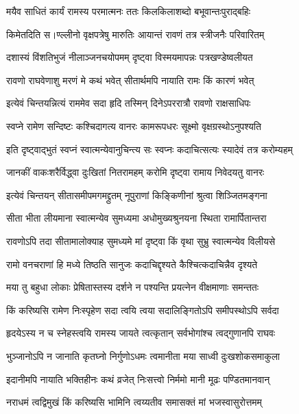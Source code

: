 \twolineshloka
{मयैव साधितं कार्यं रामस्य परमात्मनः}
{ततः किलकिलाशब्दो बभूवान्तःपुराद्बहिः} %

\twolineshloka
{किमेतदिति स।ण्ल्लीनो वृक्षपत्रेषु मारुतिः}
{आयान्तं रावणं तत्र स्त्रीजनैः परिवारितम्} %

\twolineshloka
{दशास्यं विंशतिभुजं नीलाञ्जनचयोपमम्}
{दृष्ट्वा विस्मयमापन्नः पत्रखण्डेष्वलीयत} %

\twolineshloka
{रावणो राघवेणाशु मरणं मे कथं भवेत्}
{सीतार्थमपि नायाति रामः किं कारणं भवेत्} %

\twolineshloka
{इत्येवं चिन्तयन्नित्यं राममेव सदा हृदि}
{तस्मिन् दिनेऽपररात्रौ रावणो राक्षसाधिपः} %

\twolineshloka
{स्वप्ने रामेण सन्दिष्टः कश्चिदागत्य वानरः}
{कामरूपधरः सूक्ष्मो वृक्षग्रस्थोऽनुपश्यति} %

\twolineshloka
{इति दृष्ट्वाद्भुतं स्वप्नं स्वात्मन्येवानुचिन्त्य सः}
{स्वप्नः कदाचित्सत्यः स्यादेवं तत्र करोम्यहम्} %

\twolineshloka
{जानकीं वाकःशरैर्विद्ध्वा दुःखितां नितरामहम्}
{करोमि दृष्ट्वा रामाय निवेदयतु वानरः} %

\twolineshloka
{इत्येवं चिन्तयन् सीतासमीपमगमद्द्रुतम्}
{नूपुराणां किङ्किणीनां श्रुत्वा शिञ्जितमङ्गना} %

\twolineshloka
{सीता भीता लीयमाना स्वात्मन्येव सुमध्यमा}
{अधोमुख्यश्रुनयना स्थिता रामार्पितान्तरा} %

\twolineshloka
{रावणोऽपि तदा सीतामालोक्याह सुमध्यमे}
{मां दृष्ट्वा किं वृथा सुभ्रु स्वात्मन्येव विलीयसे} %

\twolineshloka
{रामो वनचराणां हि मध्ये तिष्ठति सानुजः}
{कदाचिद्दृश्यते कैश्चित्कदाचिन्नैव दृश्यते} %

\twolineshloka
{मया तु बहुधा लोकाः प्रेषितास्तस्य दर्शने}
{न पश्यन्ति प्रयत्नेन वीक्षमाणाः समन्ततः} %

\twolineshloka
{किं करिष्यसि रामेण निःस्पृहेण सदा त्वयि}
{त्वया सदालिङ्गितोऽपि समीपस्थोऽपि सर्वदा} %

\twolineshloka
{हृदयेऽस्य न च स्नेहस्त्वयि रामस्य जायते}
{त्वत्कृतान् सर्वभोगांश्च त्वद्गुणानपि राघवः} %

\twolineshloka
{भुञ्जानोऽपि न जानाति कृतघ्नो निर्गुणोऽधमः}
{त्वमानीता मया साध्वी दुःखशोकसमाकुला} %

\twolineshloka
{इदानीमपि नायाति भक्तिहीनः कथं व्रजेत्}
{निःसत्त्वो निर्ममो मानी मूढः पण्डितमानवान्} %

\twolineshloka
{नराधमं त्वद्विमुखं किं करिष्यसि भामिनि}
{त्वय्यतीव समासक्तं मां भजस्वासुरोत्तमम्} %


